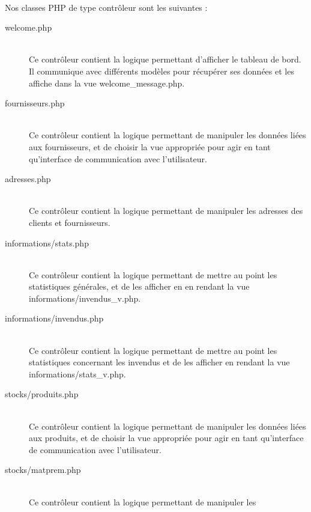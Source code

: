     \paragraph{}
        Nos classes PHP de type contrôleur sont les suivantes :
        \begin{description}
            \item[welcome.php]\hfill \\
                Ce contrôleur contient la logique permettant d'afficher le
                tableau de bord.
                Il communique avec différents modèles pour récupérer ses données
                et les affiche dans la vue welcome\_message.php.
            \item[fournisseurs.php]\hfill \\
                Ce contrôleur contient la logique permettant de manipuler les
                données liées aux fournisseurs, et de choisir la vue
                appropriée pour agir en tant qu'interface de communication 
                avec l'utilisateur.
            \item[adresses.php]\hfill \\
                Ce contrôleur contient la logique permettant de manipuler les
                adresses des clients et fournisseurs.
            \item[informations/stats.php]\hfill \\
                Ce contrôleur contient la logique permettant de mettre au
                point les statistiques générales, et de les afficher en
                en rendant la vue informations/invendus\_v.php.
            \item[informations/invendus.php]\hfill \\
                Ce contrôleur contient la logique permettant de mettre au
                point les statistiques concernant les invendus et de les 
                afficher en rendant la vue informations/stats\_v.php.
            \item[stocks/produits.php]\hfill \\
                Ce contrôleur contient la logique permettant de manipuler les
                données liées aux produits, et de choisir la vue appropriée
                pour agir en tant qu'interface de communication avec
                l'utilisateur.
            \item[stocks/matprem.php]\hfill \\
                Ce contrôleur contient la logique permettant de manipuler les

\end{description}
